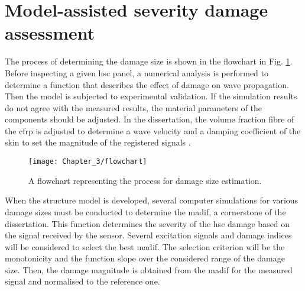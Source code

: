 \section{Model-assisted severity damage assessment }
\label{sec:madif}


The process of determining the damage size is shown in the flowchart in Fig. \ref{fig:Flowchart}.
Before inspecting a given \ac{hsc} panel, a numerical analysis is performed to determine a function that describes the effect of damage on wave propagation.
Then the model is subjected to experimental validation.
If the simulation results do not agree with the measured results, the material parameters of the components should be adjusted.
In the dissertation, the volume fraction fibre of the \ac{cfrp} is adjusted to determine a wave velocity \cite{kudela2007modelling} and a damping coefficient of the skin to set the magnitude of the registered signals \cite{wandowski2017guided}.
\begin{figure}[H]
	\begin{center}
		\texttt{[image: Chapter\_3/flowchart]}
	\end{center}
	\caption{A flowchart representing the process for damage size estimation.}
	\label{fig:Flowchart}
\end{figure}

When the structure model is developed, several computer simulations for various damage sizes must be conducted to determine the \ac{madif}, a cornerstone of the dissertation. This function determines the severity of the \ac{hsc} damage based on the signal received by the sensor.
Several excitation signals and damage indices will be considered to select the best \ac{madif}.
The selection criterion will be the monotonicity and the function slope over the considered range of the damage size. Then, the damage magnitude is obtained from the \ac{madif} for the measured signal and normalised to the reference one.



